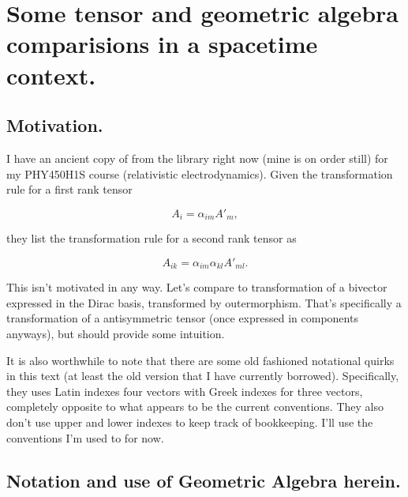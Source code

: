 
%

\chapter{Some tensor and geometric algebra comparisions in a spacetime context.}
\label{chap:antisymmetricTensorTx}
{}
\date{Jan 14, 2011}

\beginArtWithToc

\section{Motivation.}

I have an ancient copy of \cite{landau1980classical} from the library right now (mine is on order still) for my PHY450H1S course (relativistic electrodynamics).  Given the transformation rule for a first rank tensor

\begin{equation}\label{eqn:antisymmetricTensorTx:5}
A_{i} = \alpha_{im} A'_{m},
\end{equation}

they list the transformation rule for a second rank tensor as

\begin{equation}\label{eqn:antisymmetricTensorTx:10}
A_{ik} = \alpha_{im} \alpha_{kl} A'_{ml}.
\end{equation}

This isn't motivated in any way.  Let's compare to transformation of a bivector expressed in the Dirac basis, transformed by outermorphism.  That's specifically a transformation of a antisymmetric tensor (once expressed in components anyways), but should provide some intuition.

It is also worthwhile to note that there are some old fashioned notational quirks in this text (at least the old version that I have currently borrowed).  Specifically, they uses Latin indexes four vectors with Greek indexes for three vectors, completely opposite to what appears to be the current conventions.  They also don't use upper and lower indexes to keep track of bookkeeping.  I'll use the conventions I'm used to for now.

\section{Notation and use of Geometric Algebra herein.}


